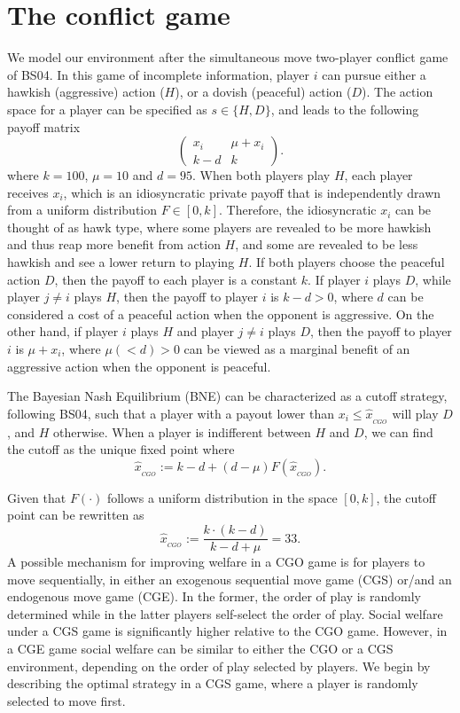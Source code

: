 \documentclass[12pt, letterpaper]{article}
\theoremstyle{plain}
\begin{document}
\section{The conflict game}
\label{sec:model}
We model our environment after the simultaneous move two-player conflict game of BS04. In this game of incomplete information, player $i$ can pursue either a hawkish (aggressive) action ($H$), or a dovish (peaceful) action ($D$). The action space for a player can be specified as $s\in\{H,D\}$, and leads to the following payoff matrix
\begin{equation}
\begin{pmatrix}
x_i & \mu+x_i \\
k-d & k 
\label{t:payoff}
\end{pmatrix}.
\end{equation}
where $k=100$, $\mu=10$ and $d=95$. When both players play $H$, each player receives $x_i$, which is an idiosyncratic private payoff that is independently drawn from a uniform distribution $F\in [0,k]$. Therefore, the idiosyncratic $x_i$ can be thought of as hawk type, where some players are revealed to be more hawkish and thus reap more benefit from action $H$, and some are revealed to be less hawkish and see a lower return to playing $H$. If both players choose the peaceful action $D$, then the payoff to each player is a constant $k$. If player $i$ plays $D$, while player $j\neq i$ plays $H$, then the payoff to player $i$ is $k-d>0$, where $d$ can be considered a cost of a peaceful action when the opponent is aggressive. On the other hand, if player $i$ plays $H$ and player $j\neq i$ plays $D$, then the payoff to player $i$ is $\mu+x_i$, where $\mu (<d)>0$ can be viewed as a marginal benefit of an aggressive action when the opponent is peaceful. 

The Bayesian Nash Equilibrium (BNE) can be characterized as a cutoff strategy, following BS04, such that a player with a payout lower than $x_i\leq\hat{x}_{_{CGO}}$ will play $D$, and $H$ otherwise.  When a player is indifferent between $H$ and $D$, we can find the cutoff as the unique fixed point where 
\begin{equation}
\hat{x}_{_{CGO}}:= k-d + (d-\mu) F(\hat{x}_{_{CGO}}). \label{eq:cgo}
\end{equation}

\noindent Given that $F(\cdot)$ follows a uniform distribution in the space $[0,k]$, the cutoff point can be rewritten as 
\begin{equation}
\hat{x}_{_{CGO}}:= \frac{k\cdot (k-d)}{k-d+\mu}=33. \label{eq:cgosol}
\end{equation}
A possible mechanism for improving welfare in a CGO game is for players to move sequentially, in either an exogenous sequential move game (CGS) or/and an endogenous move game (CGE). In the former, the order of play is randomly determined while in the latter players self-select the order of play. Social welfare under a CGS game is significantly higher relative to the CGO game. However, in a CGE game social welfare can be similar to either the CGO or a CGS environment, depending on the order of play selected by players. We begin by describing the optimal strategy in a CGS game, where a player is randomly selected to move first. 
\end{document}
